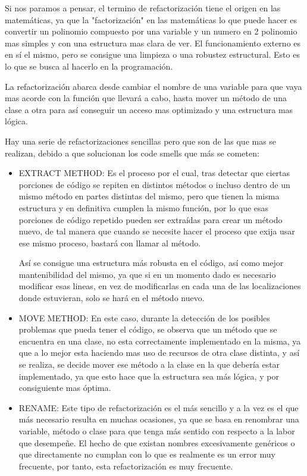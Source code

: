 Si nos paramos a pensar, el termino de refactorización tiene el origen en las matemáticas, ya que la "factorización" en las matemáticas lo que puede hacer es convertir un polinomio compuesto por una variable y un numero en 2 polinomio mas simples y con una estructura mas clara de ver. El funcionamiento externo es en sí el mismo, pero se consigue una limpieza o una robustez estructural. Esto es lo que se busca al hacerlo en la programación.

La refactorización abarca desde cambiar el nombre de una variable para que vaya mas acorde con la función que llevará a cabo, hasta mover un método de una clase a otra para así conseguir un acceso mas optimizado y una estructura mas lógica.

Hay una serie de refactorizaciones sencillas pero que son de las que mas se realizan, debido a que solucionan los code smells que más se cometen:
\begin{itemize}
\item EXTRACT METHOD: Es el proceso por el cual, tras detectar que ciertas porciones de código se repiten en distintos métodos o incluso dentro de un mismo método en partes distintas del mismo, pero que tienen la misma estructura y en definitiva cumplen la mismo función, por lo que esas porciones de código repetido pueden ser extraídas para crear un método nuevo, de tal manera que cuando se necesite hacer el proceso que exija usar ese mismo proceso, bastará con llamar al método. 

Así se consigue una estructura más robusta en el código, así como mejor mantenibilidad del mismo, ya que si en un momento dado es necesario modificar esas lineas, en vez de modificarlas en cada una de las localizaciones donde estuvieran, solo se hará en el método nuevo.

\item MOVE METHOD: En este caso, durante la detección de los posibles problemas que pueda tener el código, se observa que un método que se encuentra en una clase, no esta correctamente implementado en la misma, ya que a lo mejor esta haciendo mas uso de recursos de otra clase distinta, y así se realiza, se decide mover ese método a la clase en la que debería estar implementado, ya que esto hace que la estructura sea más lógica, y por consiguiente mas óptima.

\item RENAME: Este tipo de refactorización es el más sencillo y a la vez es el que más necesario resulta en muchas ocasiones, ya que se basa en renombrar una variable, método o clase para que tenga más sentido con respecto a la labor que desempeñe. El hecho de que existan nombres excesivamente genéricos o que directamente no cumplan con lo que es realmente es un error muy frecuente, por tanto, esta refactorización es muy frecuente.
\end{itemize}

